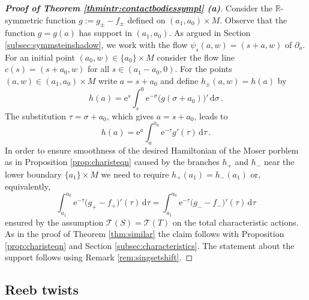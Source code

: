 \documentclass{amsart}
\theoremstyle{definition}
\newcommand{\rmd}{\mathrm d}
\newcommand{\rme}{\mathrm e}
\newcommand{\R}{\mathbb R}
\newcommand{\TT}{\mathcal T}
\begin{document}
\begin{proof}
[{\bf Proof of Theorem \ref{thmintr:contactbodiessympl} (a)}]
Consider the $\R$-symmetric function
$g:=g_{\pm}-f_{\pm}$ defined on $(a_1,a_0)\times M$.
Observe that the function $g=g(a)$
has support in $(a_1,a_0)$.
As argued in Section \ref{subsec:symmsteinshadow},
we work with the flow
$\psi_s(a,w)=(s+a,w)$ of $\partial_a$.
For an initial point $(a_0,w)\in\{a_0\}\times M$
consider the flow line
$c(s)=(s+a_0,w)$ for all $s\in(a_1-a_0,0)$.
For the points $(a,w)\in(a_1,a_0)\times M$
write $a=s+a_0$ and define
$h_{\pm}(a,w)=h(a)$ by
  \[
    h(a)=
    \rme^s
        \int_s^0
          \rme^{-\sigma}
          \big(
          	g(\sigma+a_0)\big)'\,
        \rmd\sigma
        \,.
  \]
The substitution $\tau=\sigma+a_0$,
which gives $a=s+a_0$, leads to
  \[
    h(a)=
    \rme^a
        \int_a^{a_0}
        \rme^{-\tau}g'(\tau)\,
        \rmd\tau
        \,.
  \]
  In order to ensure smoothness 
  of the desired Hamiltonian of the Moser porblem
  as in Proposition \ref{prop:charisteqn}
  caused by the branches $h_+$ and $h_-$
  near the lower boundary $\{a_1\}\times M$
  we need to require $h_+(a_1)=h_-(a_1)$
  or, equivalently,
  \[
        \int_{a_1}^{a_0}
        \rme^{-\tau}
        \big(g_+-f_+\big)'(\tau)\,
        \rmd\tau
        =
        \int_{a_1}^{a_0}
        \rme^{-\tau}
        \big(g_--f_-\big)'(\tau)\,
        \rmd\tau
  \]
  ensured by the assumption
  $\TT(S)=\TT(T)$
  on the total characteristic actions.
  As in the proof of Theorem \ref{thm:similar}
  the claim follows with 
  Proposition \ref{prop:charisteqn}
  and Section \ref{subsec:characteristics}.
  The statement about the support
  follows using Remark \ref{rem:singsetshift}.
\end{proof}



\subsection{Reeb twists\label{subsec:reebtwists}}
\end{document}
